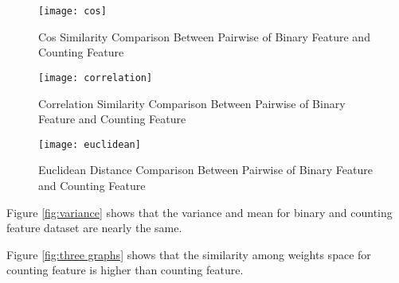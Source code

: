 



\begin{figure*}
    \centering
    \begin{subfigure}[b]{0.3\textwidth}
        \centering
        \texttt{[image: cos]}
        \caption{Cos Similarity Comparison Between Pairwise of Binary Feature and Counting Feature}
        \label{fig:cos}
    \end{subfigure}
    \hfill
    \begin{subfigure}[b]{0.3\textwidth}
        \centering
        \texttt{[image: correlation]}
        \caption{Correlation Similarity Comparison Between Pairwise of Binary Feature and Counting Feature}
        \label{fig:correlation}
    \end{subfigure}
    \hfill
    \begin{subfigure}[b]{0.3\textwidth}
        \centering
        \texttt{[image: euclidean]}
        \caption{Euclidean Distance Comparison Between Pairwise of Binary Feature and Counting Feature}
        \label{fig:euclidean}
    \end{subfigure}
    \caption{Comparison of Binary and Counting Feature Model Weights Space}
    \label{fig:three graphs}
\end{figure*}


Figure \ref{fig:variance} shows that the variance and mean for binary and counting feature dataset are nearly the same. 

Figure \ref{fig:three graphs} shows that the similarity among weights space for counting feature is higher than counting feature. 




